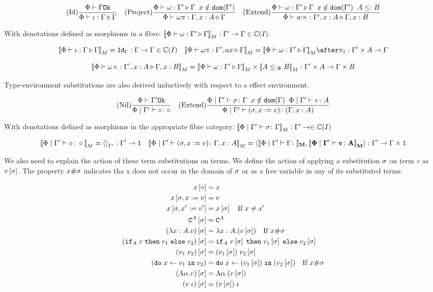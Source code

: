 \documentclass{Report}
\begin{document}
\[
    (\text{Id}) \frac{\Phi\vdash \Gamma \texttt{Ok}}{\Phi\vdash \iota : \Gamma \triangleright \Gamma}
    \quad  
    (\text{Project}) \frac{\Phi\vdash \omega : \Gamma' \triangleright \Gamma\;\; x \notin \texttt{dom}(\Gamma')}{\Phi\vdash \omega \pi : \Gamma, x: A \triangleright \Gamma}
    \quad
    (\text{Extend}) \frac{\Phi\vdash \omega : \Gamma' \triangleright \Gamma\;\; x \notin \texttt{dom}(\Gamma')\;\; A \leq: B}{\Phi\vdash w \times : \Gamma', x: A \triangleright \Gamma, x: B}
\]

With denotations defined as morphisms in a fibre: ${\bf [\![}\Phi\vdash \omega : \Gamma' \triangleright \Gamma{\bf ]\!]}_M: \Gamma' \rightarrow \Gamma \in \mathbb{C}(I)$.

\[
    \deno{\pewrel{\i}{\G}{\G}} = \idg: \G \rightarrow \G \in \C(I)
    \quad
    \deno{\pewrel{\w\pi}{\G', ax}{\G}} = \deno{\pewrel{\w}{\G'}{\G}}\after\p: \G'\times A \rightarrow \G
\]

\[
    {\bf [\![}\Phi\vdash \omega\times : \Gamma', x: A \triangleright \Gamma, x: B{\bf ]\!]}_M = {\bf [\![}\Phi\vdash \omega : \Gamma' \triangleright \Gamma{\bf ]\!]}_M\times {\bf [\![}A\leq:_\Phi B{\bf ]\!]}_M: \Gamma'\times A \rightarrow \Gamma\times B
\]

Type-environment substitutions are also derived inductively with respect to a effect environment.


\[
    (\text{Nil}) \frac{\Phi\vdash \Gamma' \texttt{Ok}}{\Phi\mid\Gamma' \vdash \diamond \colon \diamond}
    \quad
    (\text{Extend}) \frac{
        \Phi\mid\Gamma' \vdash \sigma \colon \Gamma
        \;\;
        x\notin\texttt{dom}(\Gamma)
        \;\;
        \Phi\mid\Gamma' \vdash v \colon A
    }{
        \Phi\mid\Gamma' \vdash (\sigma, x := v) \colon (\Gamma, x: A)
    }
\]

With denotations defined as morphisms in the appropriate fibre category: ${\bf [\![}\Phi\mid\Gamma' \vdash \sigma \colon \Gamma{\bf ]\!]}_M: \Gamma' \rightarrow \in \mathbb{C}(I)$

\[
    \deno{\etyperelation{\P}{\G'}{\nil}{\nil}} = \term{\G'}: \G' \rightarrow \1
    \quad
    \deno{\etyperelation{\P}{\G'}{(\si, x \setto v)}{\gax}} = \pr{\deno{\etyperelation{\P}{\G'}{\G}}}{\deno{\etyperelation{\P}{\G'}{v}{A}}}: \G' \rightarrow \G\times \1
\]

We also need to explain the action of these term substitutions on terms. We define the action of applying a substitution $\sigma$  on term $v$ as $v\left[\sigma\right]$. The property $x\#\sigma$ indicates tha x does not occur in the domain of $\sigma$ or as a free variable in any of its substituted terms.

\begin{align}
    x\left[\diamond\right] & = x \\
    x\left[\sigma,x:= v\right] & = v \\
    x\left[\sigma,x':= v'\right] & = x\left[\sigma\right]\quad\text{If }x \neq x'\\
    \texttt{C}^{A}\left[\sigma\right] & = \texttt{C}^{A} \\
    (\lambda x : A. v)\left[\sigma\right] &= \lambda x : A. (v\left[\sigma\right])\quad\text{If }x\#\sigma\\
    (\texttt{if}_{A}\; v\; \texttt{then}\; v_1 \;\texttt{else} \; v_2)\left[\sigma\right] &= \texttt{if}_{A}\; v\left[\sigma\right]\; \texttt{then}\; v_1\left[\sigma\right] \;\texttt{else} \; v_2\left[\sigma\right]\\
    (v_1\; v_2)\left[\sigma\right]&= (v_1\left[\sigma\right])\; v_2\left[\sigma\right]\\
    (\texttt{do}\; x \leftarrow v_1 \;\texttt{in}\; v_2)&= \texttt{do}\; x \leftarrow (v_1\left[\sigma\right]) \;\texttt{in}\; (v_2\left[\sigma\right])\quad\text{If } x\#\sigma\\
    (\Lambda \alpha. v)\left[\sigma\right] & = \Lambda \alpha. (v\left[\sigma\right])\\
    (v\;\epsilon)\left[\sigma\right] & = (v\left[\sigma\right])\;\epsilon\\
\end{align}
\end{document}
